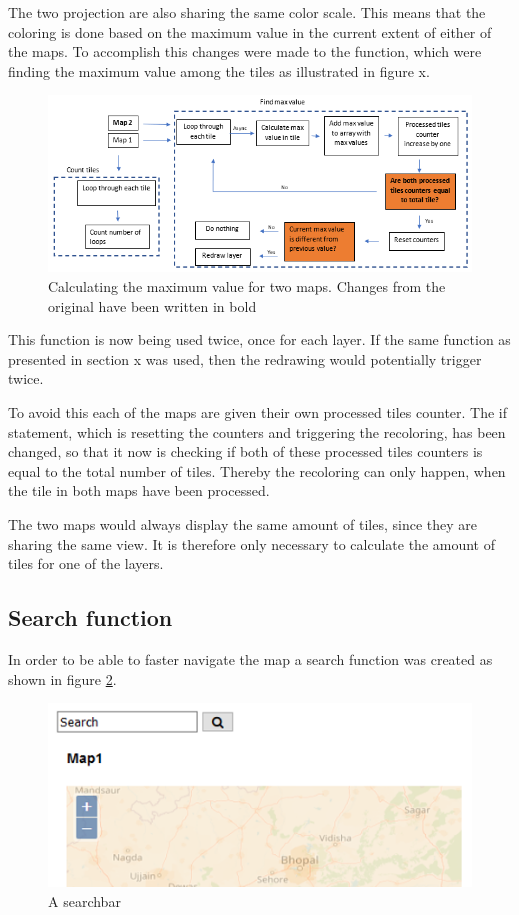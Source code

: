 The two projection are also sharing the same color scale. This means that the coloring is done based on the maximum value in the current extent of either of the maps. To accomplish this changes were made to the function, which were finding the maximum value among the tiles as illustrated in figure x.
 
\begin{figure} [H]
	\centering
	\includegraphics[width=.8\textwidth]{Pictures/ChangeToMaxCalculation}
	\caption{Calculating the maximum value for two maps. Changes from the original have been written in bold}
	\label{ChangeToMaxCalculation}
\end{figure}

This function is now being used twice, once for each layer. If the same function as presented in section x was used, then the redrawing would potentially trigger twice. 

To avoid this each of the maps are given their own processed tiles counter. The if statement, which is resetting the counters and triggering the recoloring, has been changed, so that it now is checking if both of these processed tiles counters is equal to the total number of tiles. Thereby the recoloring can only happen, when the tile in both maps have been processed. 

The two maps would always display the same amount of tiles, since they are sharing the same view. It is therefore only necessary to calculate the amount of tiles for one of the layers. 

\subsection{Search function}
In order to be able to faster navigate the map a search function was created as shown in figure \ref{SearchBar}. 

\begin{figure} [H]
	\centering
	\includegraphics[width=.8\textwidth]{Pictures/SearchBar}
	\caption{A searchbar}
	\label{SearchBar}
\end{figure}

